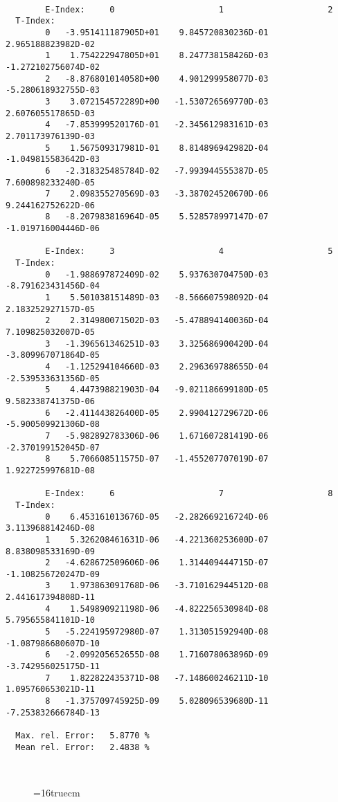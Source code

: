 \documentclass[12pt]{article}
\begin{document}
\begin{small}\begin{verbatim}

        E-Index:     0                     1                     2
  T-Index:
        0   -3.951411187905D+01    9.845720830236D-01    2.965188823982D-02
        1    1.754222947805D+01    8.247738158426D-03   -1.272102756074D-02
        2   -8.876801014058D+00    4.901299958077D-03   -5.280618932755D-03
        3    3.072154572289D+00   -1.530726569770D-03    2.607605517865D-03
        4   -7.853999520176D-01   -2.345612983161D-03    2.701173976139D-03
        5    1.567509317981D-01    8.814896942982D-04   -1.049815583642D-03
        6   -2.318325485784D-02   -7.993944555387D-05    7.600898233240D-05
        7    2.098355270569D-03   -3.387024520670D-06    9.244162752622D-06
        8   -8.207983816964D-05    5.528578997147D-07   -1.019716004446D-06

        E-Index:     3                     4                     5
  T-Index:
        0   -1.988697872409D-02    5.937630704750D-03   -8.791623431456D-04
        1    5.501038151489D-03   -8.566607598092D-04    2.183252927157D-05
        2    2.314980071502D-03   -5.478894140036D-04    7.109825032007D-05
        3   -1.396561346251D-03    3.325686900420D-04   -3.809967071864D-05
        4   -1.125294104660D-03    2.296369788655D-04   -2.539533631356D-05
        5    4.447398821903D-04   -9.021186699180D-05    9.582338741375D-06
        6   -2.411443826400D-05    2.990412729672D-06   -5.900509921306D-08
        7   -5.982892783306D-06    1.671607281419D-06   -2.370199152045D-07
        8    5.706608511575D-07   -1.455207707019D-07    1.922725997681D-08

        E-Index:     6                     7                     8
  T-Index:
        0    6.453161013676D-05   -2.282669216724D-06    3.113968814246D-08
        1    5.326208461631D-06   -4.221360253600D-07    8.838098533169D-09
        2   -4.628672509606D-06    1.314409444715D-07   -1.108256720247D-09
        3    1.973863091768D-06   -3.710162944512D-08    2.441617394808D-11
        4    1.549890921198D-06   -4.822256530984D-08    5.795655841101D-10
        5   -5.224195972980D-07    1.313051592940D-08   -1.087986680607D-10
        6   -2.099205652655D-08    1.716078063896D-09   -3.742956025175D-11
        7    1.822822435371D-08   -7.148600246211D-10    1.095760653021D-11
        8   -1.375709745925D-09    5.028096539680D-11   -7.253832666784D-13

  Max. rel. Error:   5.8770 %
  Mean rel. Error:   2.4838 %



\end{verbatim}\end{small}
\begin{figure} \label{2.2.5d}
\epsfxsize=16truecm
\end{figure}
\end{document}
